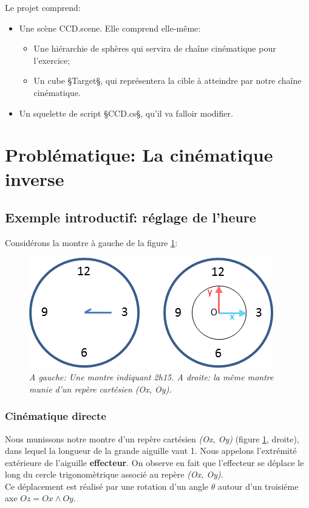 \documentclass{article}
\begin{document}
Le projet comprend:
\begin{itemize}
	\item Une sc\`ene CCD.scene. Elle comprend elle-m\^eme:
		\begin{itemize} 
			\item Une hi\'erarchie de sph\`eres qui servira de cha\^ine cin\'ematique pour l'exercice;
			\item Un cube §Target§, qui repr\'esentera la cible \`a atteindre par notre cha\^ine cin\'ematique.
		\end{itemize}
	\item Un squelette de script §CCD.cs§, qu'il va falloir modifier.
\end{itemize}

\section{Probl\'ematique: La cin\'ematique inverse}
\label{problem}

\subsection{Exemple introductif: r\'eglage de l'heure}
\label{montreex}
Consid\'erons la montre \`a gauche de la figure \ref{watch}:
\begin{figure}[htb]
  \centering
    \includegraphics[]{watch2}
  \caption{
          \textit{A gauche: Une montre indiquant 2h15. A droite: la m\^eme montre munie d'un rep\`ere cart\'esien (Ox, Oy).}}
		   \label{watch}
\end{figure}

\subsubsection*{Cin\'ematique directe}
Nous munissons notre montre d'un rep\`ere cart\'esien \textit{(Ox, Oy)} (figure \ref{watch}, droite), dans lequel la longueur
de la grande aiguille vaut 1.
Nous appelons l'extr\'emit\'e ext\'erieure de l'aiguille \textbf{effecteur}. On observe en fait que l'effecteur se d\'eplace
le long du cercle trigonom\`etrique associ\'e au rep\`ere \textit{(Ox, Oy)}. \\
Ce d\'eplacement est r\'ealis\'e par une rotation d'un angle $\theta$ autour d'un troisi\'eme axe $Oz = Ox \wedge Oy$.
\end{document}
